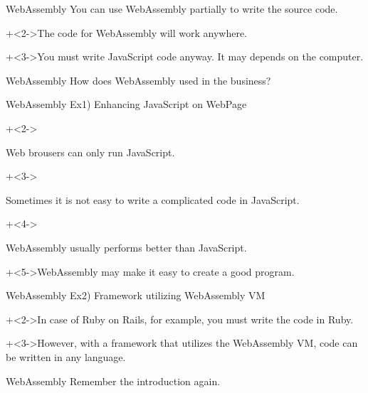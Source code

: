 \begin{frame}{WebAssembly}{}
    You can use WebAssembly partially to write the source code.
    \vspace{4ex}

    \onslide+<2->{The code for WebAssembly will work anywhere.}
    \vspace{4ex}

    \onslide+<3->{You must write JavaScript code anyway. It may depends on the computer.}
\end{frame}


\begin{frame}{WebAssembly}{}
    {\Large How does WebAssembly used in the business?}
\end{frame}


\begin{frame}{WebAssembly}{}
    Ex1) Enhancing JavaScript on WebPage
    \vspace{4ex}

    \begin{itemize}
        \onslide+<2->{\item Web brousers can only run JavaScript.}
        \onslide+<3->{\item Sometimes it is not easy to write a complicated code in JavaScript.}
        \onslide+<4->{\item WebAssembly usually performs better than JavaScript.}
    \end{itemize}
    \vspace{4ex}

    \onslide+<5->{WebAssembly may make it easy to create a good program.}
\end{frame}


\begin{frame}{WebAssembly}{}
    Ex2) Framework utilizing WebAssembly VM
    \vspace{4ex}

    \onslide+<2->{In case of Ruby on Rails, for example, you must write the code in Ruby.}
    \vspace{4ex}

    \onslide+<3->{However, with a framework that utilizes the WebAssembly VM, code can be written in any language.}
\end{frame}


\begin{frame}{WebAssembly}{}
    Remember the introduction again.
\end{frame}


